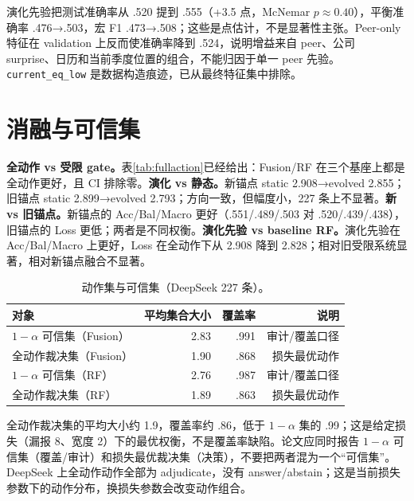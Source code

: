 \begin{revbox}
\noindent 演化先验把测试准确率从 .520 提到 .555（+3.5 点，McNemar $p\approx0.40$），平衡准确率 .476→.503，宏 F1 .473→.508；这些是点估计，不是显著性主张。Peer-only 特征在 validation 上反而使准确率降到 .524，说明增益来自 peer、公司 surprise、日历和当前季度位置的组合，不能归因于单一 peer 先验。\texttt{current\_eq\_low} 是数据构造痕迹，已从最终特征集中排除。
\end{revbox}

\section{消融与可信集}

\begin{revbox}
\noindent\textbf{全动作 vs 受限 gate。}表\ref{tab:fullaction}已经给出：Fusion/RF 在三个基座上都是全动作更好，且 CI 排除零。\textbf{演化 vs 静态。}新锚点 static 2.908→evolved 2.855；旧锚点 static 2.899→evolved 2.793；方向一致，但幅度小，227 条上不显著。\textbf{新 vs 旧锚点。}新锚点的 Acc/Bal/Macro 更好（.551/.489/.503 对 .520/.439/.438），旧锚点的 Loss 更低；两者是不同权衡。\textbf{演化先验 vs baseline RF。}演化先验在 Acc/Bal/Macro 上更好，Loss 在全动作下从 2.908 降到 2.828；相对旧受限系统显著，相对新锚点融合不显著。
\end{revbox}

\begin{table}[H]
\centering
{}
\setlength{\tabcolsep}{3pt}
\caption{动作集与可信集（DeepSeek 227 条）。}
\label{tab:sets}
\begin{tabular}{lrrr}
\toprule
对象 & 平均集合大小 & 覆盖率 & 说明 \\
\midrule
$1-\alpha$ 可信集（Fusion） & 2.83 & .991 & 审计/覆盖口径 \\
\rowcolor{yellow!18} 全动作裁决集（Fusion） & 1.90 & .868 & 损失最优动作 \\
$1-\alpha$ 可信集（RF） & 2.76 & .987 & 审计/覆盖口径 \\
\rowcolor{yellow!18} 全动作裁决集（RF） & 1.89 & .863 & 损失最优动作 \\
\bottomrule
\end{tabular}
\end{table}

\begin{revbox}
\noindent 全动作裁决集的平均大小约 1.9，覆盖率约 .86，低于 $1-\alpha$ 集的 .99；这是给定损失（漏报 8、宽度 2）下的最优权衡，不是覆盖率缺陷。论文应同时报告 $1-\alpha$ 可信集（覆盖/审计）和损失最优裁决集（决策），不要把两者混为一个“可信集”。DeepSeek 上全动作动作全部为 adjudicate，没有 answer/abstain；这是当前损失参数下的动作分布，换损失参数会改变动作组合。
\end{revbox}


